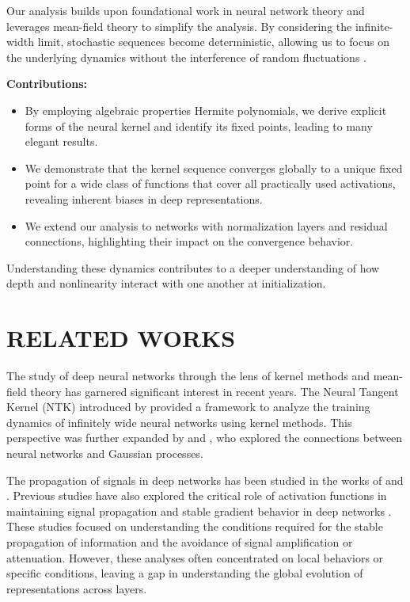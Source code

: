 \documentclass[twoside]{article}
\theoremstyle{definition}
\begin{document}
Our analysis builds upon foundational work in neural network theory and leverages mean-field theory to simplify the analysis. By considering the infinite-width limit, stochastic sequences become deterministic, allowing us to focus on the underlying dynamics without the interference of random fluctuations \citep{poole2016exponential, yang2019meanfield, mei2019mean}.

\textbf{Contributions:} 
\begin{itemize}
    \item By employing algebraic properties Hermite polynomials, we derive explicit forms of the neural kernel and identify its fixed points, leading to many elegant results.  
    \item We demonstrate that the kernel sequence converges globally to a unique fixed point for a wide class of functions that cover all practically used activations, revealing inherent biases in deep representations. 
    \item We extend our analysis to networks with normalization layers and residual connections, highlighting their impact on the convergence behavior.
\end{itemize}

Understanding these dynamics contributes to a deeper understanding of how depth and nonlinearity interact with one another at initialization. 


\section{RELATED WORKS}
The study of deep neural networks through the lens of kernel methods and mean-field theory has garnered significant interest in recent years. The Neural Tangent Kernel (NTK) introduced by \citet{jacot2018neural} provided a framework to analyze the training dynamics of infinitely wide neural networks using kernel methods. This perspective was further expanded by \citet{lee2019wide} and \citet{arora2019exact}, who explored the connections between neural networks and Gaussian processes.

The propagation of signals in deep networks has been studied in the works of \citet{schoenholz2016deep} and \citet{pennington2017resurrecting}. Previous studies have also explored the critical role of activation functions in maintaining signal propagation and stable gradient behavior in deep networks \citep{hayou2019impact}. These studies focused on understanding the conditions required for the stable propagation of information and the avoidance of signal amplification or attenuation. However, these analyses often concentrated on local behaviors or specific conditions, leaving a gap in understanding the global evolution of representations across layers. 
\end{document}
